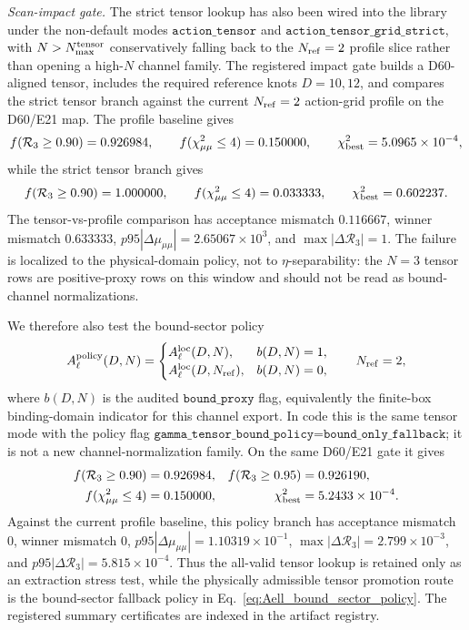 \documentclass[aps,prd,onecolumn,notitlepage,nofootinbib,superscriptaddress,11pt,floatfix]{revtex4-2}
\begin{document}
\medskip\noindent\emph{Scan-impact gate.}
The strict tensor lookup has also been wired into the library under the non-default modes \(\texttt{action\_tensor}\) and \(\texttt{action\_tensor\_grid\_strict}\), with \(N>N_{\rm max}^{\rm tensor}\) conservatively falling back to the \(N_{\rm ref}=2\) profile slice rather than opening a high-\(N\) channel family.  The registered impact gate builds a D60-aligned tensor, includes the required reference knots \(D=10,12\), and compares the strict tensor branch against the current \(N_{\rm ref}=2\) action-grid profile on the D60/E21 map.  The profile baseline gives
\begin{equation}
f(\mathcal R_3\ge0.90)=0.926984,\qquad
f(\chi^2_{\mu\mu}\le4)=0.150000,\qquad
\chi^2_{\rm best}=5.0965\times10^{-4},
\end{equation}
while the strict tensor branch gives
\begin{equation}
f(\mathcal R_3\ge0.90)=1.000000,\qquad
f(\chi^2_{\mu\mu}\le4)=0.033333,\qquad
\chi^2_{\rm best}=0.602237.
\end{equation}
The tensor-vs-profile comparison has acceptance mismatch \(0.116667\), winner mismatch \(0.633333\), \(p95|\Delta\mu_{\mu\mu}|=2.65067\times10^3\), and \(\max|\Delta\mathcal R_3|=1\).  The failure is localized to the physical-domain policy, not to \(\eta\)-separability: the \(N=3\) tensor rows are positive-proxy rows on this window and should not be read as bound-channel normalizations.

We therefore also test the bound-sector policy
\begin{equation}
A_{\ell}^{\rm policy}(D,N)=
\begin{cases}
A_{\ell}^{\rm loc}(D,N), & b(D,N)=1,\\
A_{\ell}^{\rm loc}(D,N_{\rm ref}), & b(D,N)=0,
\end{cases}
\qquad N_{\rm ref}=2,
\label{eq:Aell_bound_sector_policy}
\end{equation}
where \(b(D,N)\) is the audited \(\texttt{bound\_proxy}\) flag, equivalently the finite-box binding-domain indicator for this channel export.  In code this is the same tensor mode with the policy flag \(\texttt{gamma\_tensor\_bound\_policy=bound\_only\_fallback}\); it is not a new channel-normalization family.  On the same D60/E21 gate it gives
\begin{equation}
\begin{aligned}
f(\mathcal R_3\ge0.90)&=0.926984,&
f(\mathcal R_3\ge0.95)&=0.926190,\\
f(\chi^2_{\mu\mu}\le4)&=0.150000,&
\chi^2_{\rm best}&=5.2433\times10^{-4}.
\end{aligned}
\end{equation}
Against the current profile baseline, this policy branch has acceptance mismatch \(0\), winner mismatch \(0\), \(p95|\Delta\mu_{\mu\mu}|=1.10319\times10^{-1}\), \(\max|\Delta\mathcal R_3|=2.799\times10^{-3}\), and \(p95|\Delta\mathcal R_3|=5.815\times10^{-4}\).  Thus the all-valid tensor lookup is retained only as an extraction stress test, while the physically admissible tensor promotion route is the bound-sector fallback policy in Eq.~\eqref{eq:Aell_bound_sector_policy}.  The registered summary certificates are indexed in the artifact registry.
\end{document}
